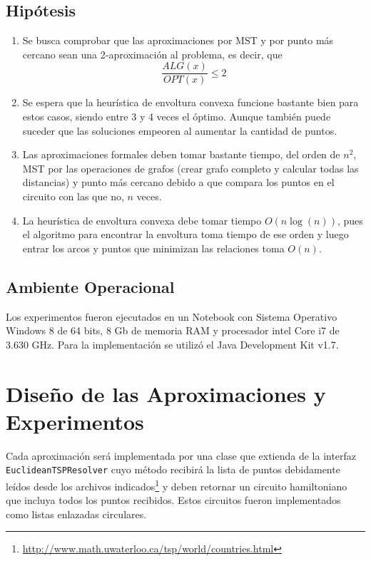\documentclass[12pt,letterpaper, margin = 3cm]{article}
\begin{document}
\subsection{Hipótesis}
\begin{enumerate}
\item Se busca comprobar que las aproximaciones por MST y por punto más cercano sean una 2-aproximación al problema, es decir, que \[ \frac{ALG(x)}{OPT(x)}\leq 2 \]
\item Se espera que la heurística de envoltura convexa funcione bastante bien para estos casos, siendo entre 3 y 4 veces el óptimo. Aunque también puede suceder que las soluciones empeoren al aumentar la cantidad de puntos.
\item Las aproximaciones formales deben tomar bastante tiempo, del orden de $n^2$, MST por las operaciones de grafos (crear grafo completo y calcular todas las distancias) y punto más cercano debido a que compara los puntos en el circuito con las que no, $n$ veces.
\item La heurística de envoltura convexa debe tomar tiempo $O(n\log(n))$, pues el algoritmo para encontrar la envoltura toma tiempo de ese orden y luego entrar los arcos y puntos que minimizan las relaciones toma $O(n)$. 
\end{enumerate}

\subsection{Ambiente Operacional}
Los experimentos fueron ejecutados en un Notebook con Sistema Operativo Windows 8 de 64 bits, 8 Gb de
memoria RAM y procesador intel Core i7 de 3.630 GHz. Para la implementación se utilizó el Java Development Kit v1.7.

\newpage
\section{Diseño de las Aproximaciones y Experimentos}
Cada aproximación será implementada por una clase que extienda de la interfaz \verb+EuclideanTSPResolver+ cuyo método recibirá la lista de puntos debidamente leídos desde los archivos indicados\footnote{\url{http://www.math.uwaterloo.ca/tsp/world/countries.html}} y deben retornar un circuito hamiltoniano que incluya todos los puntos recibidos. Estos circuitos fueron implementados como listas enlazadas circulares.
\end{document}
